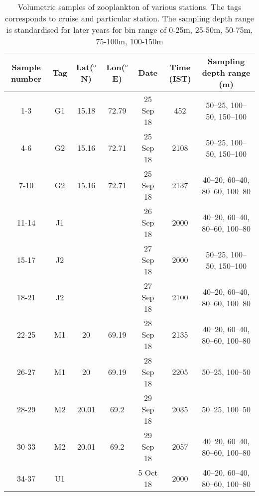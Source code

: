 \documentclass{article}
\begin{document}
\begin{table}[htbp]
	
	{\footnotesize
		\captionsetup{justification=justified,font=footnotesize,skip=0.05\baselineskip,width=\textwidth} %
		\caption{\newline Volumetric samples of zooplankton of various stations. The tags corresponds to cruise and particular station. The sampling depth range is standardised for later years for bin range of 0-25m, 25-50m, 50-75m, 75-100m, 100-150m}
		\begin{adjustwidth}{0in}{0in} 
			\begin{tabular}{ccccccc}
				\toprule
				Sample number & Tag & Lat($^o$N)    & Lon($^o$E)   & Date & Time (IST) & Sampling depth range (m)      \\
				\midrule
				1-3         & G1  & 15.18      & 72.79      & 25 Sep 18                 & 452        & 50–25, 100–50, 150–100        \\
				4-6         & G2  & 15.16      & 72.71      & 25 Sep 18                 & 2108       & 50–25, 100–50, 150–100        \\
				7-10        & G2  & 15.16      & 72.71      & 25 Sep 18                 & 2137       & 40–20, 60–40, 80–60, 100–80   \\
				11-14       & J1  &            &            & 26 Sep 18                 & 2000       & 40–20, 60–40, 80–60, 100–80   \\
				15-17       & J2  &            &            & 27 Sep 18                 & 2000       & 50–25, 100–50, 150–100        \\
				18-21       & J2  &            &            & 27 Sep 18                 & 2100       & 40–20, 60–40, 80–60, 100–80   \\
				22-25       & M1  & 20         & 69.19      & 28 Sep 18                 & 2135       & 40–20, 60–40, 80–60, 100–80   \\
				26-27       & M1  & 20         & 69.19      & 28 Sep 18                 & 2205       & 50–25, 100–50                 \\
				28-29       & M2  & 20.01      & 69.2       & 29 Sep 18                 & 2035       & 50–25, 100–50                 \\
				30-33       & M2  & 20.01      & 69.2       & 29 Sep 18                 & 2057       & 40–20, 60–40, 80–60, 100–80   \\
				34-37       & U1  &            &            & 5 Oct 18                  & 2000       & 40–20, 60–40, 80–60, 100–80   \\

\end{tabular}
\end{adjustwidth}}
\end{table}
\end{document}
